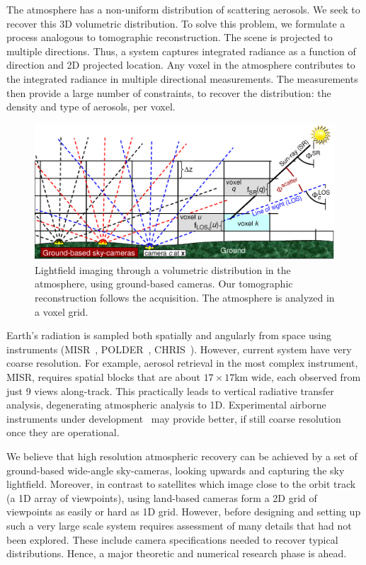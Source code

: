 \documentclass[10pt,twocolumn,letterpaper]{article}
\begin{document}
The atmosphere has a non-uniform distribution of scattering aerosols. We seek to recover this 3D volumetric distribution. To solve this problem, we formulate a process analogous to tomographic reconstruction. The scene is projected to multiple directions. Thus, a system captures integrated radiance as a function of direction and 2D projected location. Any voxel in the atmosphere contributes to the integrated radiance in multiple directional measurements. The measurements then provide a large number of constraints, to recover the distribution: the density and type of aerosols, per voxel.
\begin{figure}[t!]
   \begin{center}
\vspace{-0.4cm}
    \includegraphics[width=0.99\linewidth]{groundtomog24.eps}
    \end{center}\vspace{-1.5cm}
    \caption{\small
    Lightfield imaging through a volumetric distribution in
    the atmosphere, using ground-based cameras. Our tomographic reconstruction
    follows the acquisition. The atmosphere is analyzed in a voxel grid.}
   \label{fig:groundgrid}
\end{figure}

Earth's radiation is sampled both spatially and angularly from space using instruments (MISR~\cite{diner,matronchik}, POLDER~\cite{breon}, CHRIS~\cite{vanMol}). However, current system have very coarse resolution. For example, aerosol retrieval in the most complex instrument, MISR, requires spatial blocks that are about $17\times 17$km wide, each observed from just 9 views along-track. This practically leads to vertical radiative transfer analysis, degenerating atmospheric analysis to 1D. Experimental airborne instruments under development~\cite{baxter,dinerDavis10} may provide better, if still coarse resolution once they are operational.

We believe that high resolution atmospheric recovery can be achieved by a set of ground-based wide-angle sky-cameras, looking upwards and capturing the sky lightfield.
Moreover, in contrast to satellites which image close to the orbit track (a 1D array of viewpoints), using land-based cameras form a 2D grid of viewpoints as easily or hard as 1D grid. However, before designing and setting up such a very large scale system requires assessment of many details that had not been explored. These include camera specifications needed to recover typical distributions. Hence, a major theoretic and numerical research phase is ahead.
\end{document}
